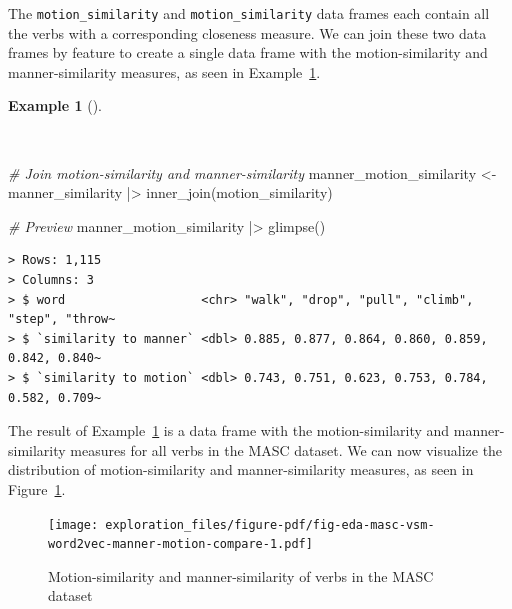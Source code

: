\documentclass[
  letterpaper,
  DIV=11,
  numbers=noendperiod]{scrreport}
\newenvironment{Shaded}{\begin{snugshade}}{\end{snugshade}}
\newcommand{\CommentTok}[1]{\textcolor[rgb]{0.00,0.00,0.00}{\textit{#1}}}
\newcommand{\FunctionTok}[1]{\textcolor[rgb]{0.00,0.00,0.00}{#1}}
\newcommand{\NormalTok}[1]{\textcolor[rgb]{0.00,0.00,0.00}{#1}}
\newcommand{\OtherTok}[1]{\textcolor[rgb]{0.00,0.00,0.00}{#1}}
\newcommand{\SpecialCharTok}[1]{\textcolor[rgb]{0.00,0.00,0.00}{#1}}
\theoremstyle{definition}
\newtheorem{example}{Example}[chapter]
\theoremstyle{remark}
\begin{document}
The \texttt{motion\_similarity} and \texttt{motion\_similarity} data
frames each contain all the verbs with a corresponding closeness
measure. We can join these two data frames by feature to create a single
data frame with the motion-similarity and manner-similarity measures, as
seen in Example~\ref{exm-eda-masc-vsm-word2vec-manner-motion}.

\begin{example}[]\protect\hypertarget{exm-eda-masc-vsm-word2vec-manner-motion}{}\label{exm-eda-masc-vsm-word2vec-manner-motion}

~

\begin{Shaded}
\begin{Highlighting}[]
\CommentTok{\# Join motion{-}similarity and manner{-}similarity}
\NormalTok{manner\_motion\_similarity }\OtherTok{\textless{}{-}} 
\NormalTok{  manner\_similarity }\SpecialCharTok{|\textgreater{}} 
  \FunctionTok{inner\_join}\NormalTok{(motion\_similarity)}

\CommentTok{\# Preview}
\NormalTok{manner\_motion\_similarity }\SpecialCharTok{|\textgreater{}} \FunctionTok{glimpse}\NormalTok{()}
\end{Highlighting}
\end{Shaded}

\begin{verbatim}
> Rows: 1,115
> Columns: 3
> $ word                   <chr> "walk", "drop", "pull", "climb", "step", "throw~
> $ `similarity to manner` <dbl> 0.885, 0.877, 0.864, 0.860, 0.859, 0.842, 0.840~
> $ `similarity to motion` <dbl> 0.743, 0.751, 0.623, 0.753, 0.784, 0.582, 0.709~
\end{verbatim}

\end{example}

The result of Example~\ref{exm-eda-masc-vsm-word2vec-manner-motion} is a
data frame with the motion-similarity and manner-similarity measures for
all verbs in the MASC dataset. We can now visualize the distribution of
motion-similarity and manner-similarity measures, as seen in
Figure~\ref{fig-eda-masc-vsm-word2vec-manner-motion-compare}.

\begin{figure}[H]

{\centering \texttt{[image: exploration\_files/figure-pdf/fig-eda-masc-vsm-word2vec-manner-motion-compare-1.pdf]}

}

\caption{\label{fig-eda-masc-vsm-word2vec-manner-motion-compare}Motion-similarity
and manner-similarity of verbs in the MASC dataset}

\end{figure}
\end{document}
